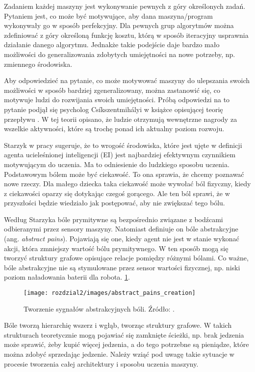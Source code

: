 Zadaniem każdej maszyny jest wykonywanie pewnych z góry określonych zadań. 
Pytaniem jest, co może być motywujące, aby dana maszyna/program wykonywały go w 
sposób perfekcyjny. Dla pewnych grup algorytmów można zdefiniować z góry 
określoną funkcję kosztu, którą w sposób iteracyjny usprawnia działanie danego 
algorytmu. Jednakże takie podejście daje bardzo mało możliwości do 
generalizowania zdobytych umiejętności na nowe potrzeby, np. zmiennego 
środowiska.

Aby odpowiedzieć na pytanie, co może motywować maszyny do ulepszania swoich 
możliwości w sposób bardziej zgeneralizowany, można zastanowić się, co motywuje 
ludzi do rozwijania swoich umiejętności. Próbą odpowiedzi na to pytanie podjął 
się psycholog Csíkszentmihályi w książce opisującej teorię przepływu 
\cite{csikszentmihalyi1996creativity}. W tej teorii opisano, że ludzie 
otrzymują wewnętrzne nagrody za wszelkie aktywności, które są trochę ponad ich 
aktualny poziom rozwoju. 

Starzyk w pracy \cite{motivation_in_ei} sugeruje, że to wrogość środowiska, 
które jest ujęte w definicji agenta ucieleśnionej inteligencji (EI) jest 
najbardziej efektywnym czynnikiem motywującym do uczenia. Ma to odniesienie do 
ludzkiego sposobu uczenia. Podstawowym bólem może być ciekawość. To ona 
sprawia, że chcemy poznawać nowe rzeczy. Dla małego dziecka taka ciekawość może 
wywołać ból fizyczny, kiedy z ciekawości oparzy się dotykając czegoś gorącego. 
Ale ten ból sprawi, że w przyszłości będzie wiedziało jak postępować, aby nie 
zwiększać tego bólu.

Według Starzyka bóle prymitywne są bezpośrednio związane z bodźcami odbieranymi 
przez sensory maszyny. Natomiast definiuje on bóle abstrakcyjne (ang. 
\textit{abstract pains}). Pojawiają się one, kiedy agent nie jest w stanie 
wykonać akcji, która zmniejszy wartość bólu prymitywnego. W ten sposób mogą się 
tworzyć struktury grafowe opisujące relacje pomiędzy różnymi bólami. Co ważne, 
bóle abstrakcyjne nie są stymulowane przez sensor wartości fizycznej, np. niski 
poziom naładowania baterii dla robota.  
\ref{fig:abstractpainscreation}.

\begin{figure}[H]
	\centering
	\texttt{[image: rozdzial2/images/abstract\_pains\_creation]}
	\caption{Tworzenie sygnałów abstrakcyjnych bóli. Źródło: 
	\cite{ml_dev_auto_systems}.}
	\label{fig:abstractpainscreation}
\end{figure}

Bóle tworzą hierarchię wszerz i wgłąb, tworząc struktury grafowe. 
W takich strukturach teoretycznie mogą pojawiać się zamknięte ścieżki, np. brak
jedzenia może sprawić, żeby kupić więcej jedzenia, a do tego potrzebne są 
pieniądze, które można zdobyć sprzedając jedzenie. Należy wziąć pod uwagę takie 
sytuacje w procesie tworzenia całej architektury i sposobu uczenia maszyny.

